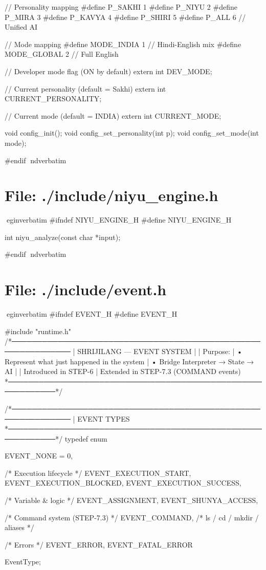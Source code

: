 \documentclass{article}
\begin{document}
// Personality mapping
#define P_SAKHI 1
#define P_NIYU  2
#define P_MIRA  3
#define P_KAVYA 4
#define P_SHIRI 5
#define P_ALL   6   // Unified AI

// Mode mapping
#define MODE_INDIA  1   // Hindi-English mix
#define MODE_GLOBAL 2   // Full English

// Developer mode flag (ON by default)
extern int DEV_MODE;

// Current personality (default = Sakhi)
extern int CURRENT_PERSONALITY;

// Current mode (default = INDIA)
extern int CURRENT_MODE;

void config_init();
void config_set_personality(int p);
void config_set_mode(int mode);

#endif
nd{verbatim}
\section*{File: ./include/niyu_engine.h}
egin{verbatim}
#ifndef NIYU_ENGINE_H
#define NIYU_ENGINE_H

int niyu_analyze(const char *input);

#endif
nd{verbatim}
\section*{File: ./include/event.h}
egin{verbatim}
#ifndef EVENT_H
#define EVENT_H

#include "runtime.h"
/*──────────────────────────────────────────────────────────────
 |  SHRIJILANG — EVENT SYSTEM
 |
 |  Purpose:
 |   • Represent what just happened in the system
 |   • Bridge Interpreter → State → AI
 |
 |  Introduced in STEP-6
 |  Extended in STEP-7.3 (COMMAND events)
 *────────────────────────────────────────────────────────────*/

/*──────────────────────────────────────────────────────────────
 |  EVENT TYPES
 *────────────────────────────────────────────────────────────*/
typedef enum {

    EVENT_NONE = 0,

    /* Execution lifecycle */
    EVENT_EXECUTION_START,
    EVENT_EXECUTION_BLOCKED,
    EVENT_EXECUTION_SUCCESS,

    /* Variable & logic */
    EVENT_ASSIGNMENT,
    EVENT_SHUNYA_ACCESS,

    /* Command system (STEP-7.3) */
    EVENT_COMMAND,          /* ls / cd / mkdir / aliases */

    /* Errors */
    EVENT_ERROR,
    EVENT_FATAL_ERROR

} EventType;
\end{document}

